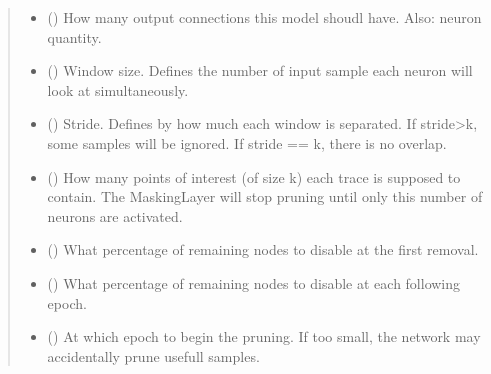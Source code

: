 \documentclass[letterpaper,10pt,english]{sphinxmanual}
\begin{document}
\begin{fulllineitems}
\begin{fulllineitems}
\begin{quote}
\begin{description}
\begin{itemize}
\item {} 
\sphinxAtStartPar
{} () \textendash{} How many output connections this model shoudl have. Also: neuron quantity.

\item {} 
\sphinxAtStartPar
{} (\sphinxstyleliteralemphasis{\sphinxupquote{, }}) \textendash{} Window size. Defines the number of input sample each neuron will look at
simultaneously.

\item {} 
\sphinxAtStartPar
{} (\sphinxstyleliteralemphasis{\sphinxupquote{, }}) \textendash{} Stride. Defines by how much each window is separated. If stride\textgreater{}k, some samples
will be ignored. If stride == k, there is no overlap.

\item {} 
\sphinxAtStartPar
{} (\sphinxstyleliteralemphasis{\sphinxupquote{, }}) \textendash{} How many points of interest (of size k) each trace is supposed to contain. The
MaskingLayer will stop pruning until only this number of neurons are activated.

\item {} 
\sphinxAtStartPar
{} (\sphinxstyleliteralemphasis{\sphinxupquote{, }}) \textendash{} What percentage of remaining nodes to disable at the first removal.

\item {} 
\sphinxAtStartPar
{} (\sphinxstyleliteralemphasis{\sphinxupquote{, }}) \textendash{} What percentage of remaining nodes to disable at each following epoch.

\item {} 
\sphinxAtStartPar
{} (\sphinxstyleliteralemphasis{\sphinxupquote{, }}) \textendash{} At which epoch to begin the pruning. If too small, the network may
accidentally prune usefull samples.


\end{itemize}
\end{description}
\end{quote}
\end{fulllineitems}
\end{fulllineitems}
\end{document}
